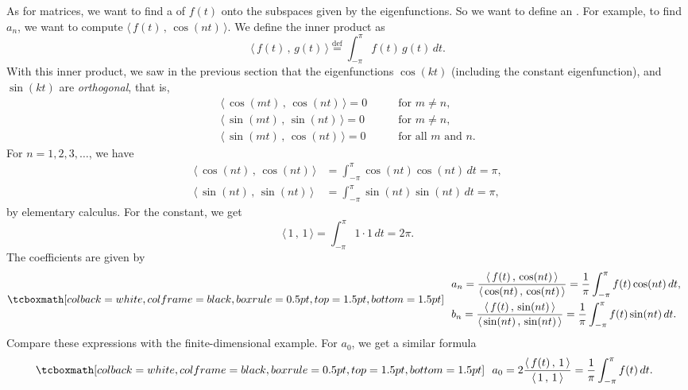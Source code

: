 As for matrices, we want to find a \emph{}
of $f(t)$ onto the subspaces given by the eigenfunctions.  So we want to
define an \emph{}.  For example, to
find $a_n$,
we want to compute $\langle \, f(t) \, , \, \cos (nt) \, \rangle$.
We define the inner product as
\begin{equation*}
\langle \, f(t)\, , \, g(t) \, \rangle \overset{\text{def}}{=}
\int_{-\pi}^\pi f(t) \, g(t) \, dt .
\end{equation*}
With this inner product,
we saw in the previous section that the eigenfunctions $\cos (kt)$
(including the constant eigenfunction), and
$\sin (kt)$ are \emph{orthogonal}, that is,
\begin{align*}
\langle \, \cos (mt)\, , \, \cos (nt) \, \rangle = 0 & \qquad \text{for } m \neq n , \\
\langle \, \sin (mt)\, , \, \sin (nt) \, \rangle = 0 & \qquad \text{for } m \neq n , \\
\langle \, \sin (mt)\, , \, \cos (nt) \, \rangle = 0 & \qquad \text{for all } m \text{ and } n .
\end{align*}
For $n=1,2,3,\ldots$,
we have
\begin{align*}
\langle \, \cos (nt) \, , \, \cos (nt) \, \rangle &=
\int_{-\pi}^\pi \cos(nt)\cos(nt) \, dt
=
\pi,
\\
\langle \, \sin (nt) \, , \, \sin (nt) \, \rangle &=
\int_{-\pi}^\pi \sin(nt)\sin(nt) \, dt
=
\pi,
\end{align*}
by elementary calculus.  For the constant, we get
\begin{equation*}
\langle \, 1 \, , \, 1 \, \rangle
=
\int_{-\pi}^\pi 1 \cdot 1 \, dt
 = 2\pi.
\end{equation*}
The coefficients are given by
\begin{equation*}
\mybxbg{~~
\begin{aligned}
& a_n =
\frac{\langle \, f(t) \, , \, \cos (nt) \, \rangle}{\langle \, \cos (nt) \, , \,
\cos (nt) \, \rangle}
= 
\frac{1}{\pi} \int_{-\pi}^\pi f(t) \cos (nt) \, dt , \\
& b_n =
\frac{\langle \, f(t) \, , \, \sin (nt) \, \rangle}{\langle \, \sin (nt) \, , \,
\sin (nt) \, \rangle}
= 
\frac{1}{\pi} \int_{-\pi}^\pi f(t) \sin (nt) \, dt .
\end{aligned}
~~}
\end{equation*}
Compare these expressions with the finite-dimensional example.
For $a_0$, we get a similar formula
\begin{equation*}
\mybxbg{~~
a_0 = 2
\frac{\langle \, f(t) \, , \, 1 \, \rangle}{\langle \, 1 \, , \,
1 \, \rangle}
=
\frac{1}{\pi} \int_{-\pi}^\pi f(t) \, dt .
~~}
\end{equation*}

